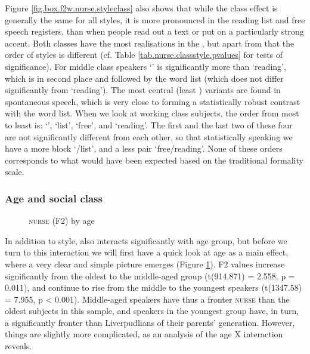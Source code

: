 Figure \ref{fig.box.f2w.nurse.styleclass} also shows that while the class effect is generally the same for all styles, it is more pronounced in the reading list and free speech registers, than when people read out a text or put on a particularly strong  accent.
Both classes have the most  realisations in the , but apart from that the order of styles is different (cf. Table \ref{tab.nurse.classstyle.pvalues} for tests of significance).
For middle class speakers `' is significantly more  than `reading', which is in second place and followed by the word list (which does not differ significantly from `reading').
The most central (least ) variants are found in spontaneous speech, which is very close to forming a statistically robust contrast with the word list.
When we look at working class subjects, the order from most  to least  is: `', `list', `free', and `reading'.
The first and the last two of these four are not significantly different from each other, so that statistically speaking we have a more  block `/list', and a less  pair `free/reading'.
None of these orders corresponds to what would have been expected based on the traditional formality scale.

\subsubsection{Age and social class}
\label{sec.prod.res.vow.nurse.f2.styleage}

\begin{figure}[h!]
	\centering
		\resizebox{0.5\linewidth}{!}{} 
	\caption{\textsc{nurse} (F2) by age}
	\label{fig.box.f2.nurse.tot}
\end{figure}

In addition to style,  also interacts significantly with age group, but before we turn to this interaction we will first have a quick look at age as a main effect, where a very clear and simple picture emerges (Figure \ref{fig.box.f2.nurse.tot}).
F2 values increase significantly from the oldest to the middle-aged group (t(914.871) = 2.558, p = 0.011), and continue to rise from the middle to the youngest speakers (t(1347.58) = 7.955, p < 0.001).
Middle-aged speakers have thus a fronter \textsc{nurse} than the oldest subjects in this sample, and speakers in the youngest group have, in turn, a significantly fronter  than Liverpudlians of their parents' generation.
However, things are slightly more complicated, as an analysis of the age X  interaction reveals.

